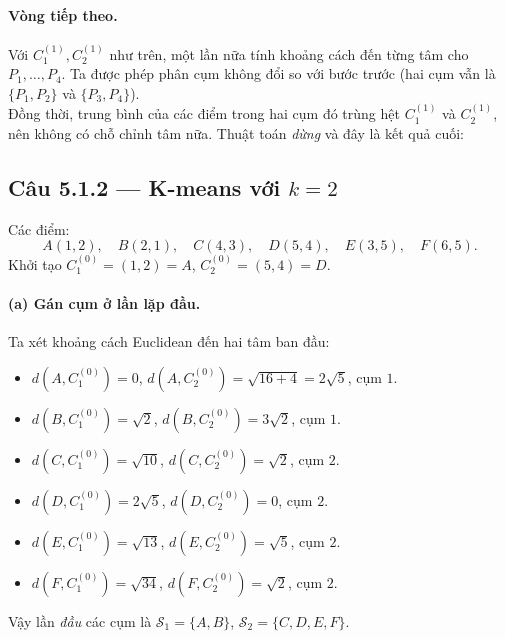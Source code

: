 \paragraph{Vòng tiếp theo.}
Với $C_1^{(1)}, C_2^{(1)}$ như trên, một lần nữa tính khoảng cách đến từng tâm cho $P_1,\ldots,P_4$. Ta được phép phân cụm không đổi so với bước trước (hai cụm vẫn là $\{P_1,P_2\}$ và $\{P_3,P_4\}$).\\
Đồng thời, trung bình của các điểm trong hai cụm đó trùng hệt $C_1^{(1)}$ và $C_2^{(1)}$, nên không có chỗ chỉnh tâm nữa. Thuật toán \emph{dừng} và đây là kết quả cuối:
\begin{center}
\end{center}

\subsection*{Câu 5.1.2 --- K-means với $k=2$}

Các điểm:
\[
A(1,2),\quad B(2,1),\quad C(4,3),\quad D(5,4),\quad E(3,5),\quad F(6,5).
\]
Khởi tạo $C_1^{(0)}=(1,2)=A$, $C_2^{(0)}=(5,4)=D$.

\paragraph{(a) Gán cụm ở lần lặp đầu.}
Ta xét khoảng cách Euclidean đến hai tâm ban đầu:
\begin{itemize}
  \item $d(A,C_1^{(0)})=0$, $d(A,C_2^{(0)})=\sqrt{16+4}=2\sqrt5$, cụm $1$.
  \item $d(B,C_1^{(0)})=\sqrt2$, $d(B,C_2^{(0)})=3\sqrt2$, cụm $1$.
  \item $d(C,C_1^{(0)})=\sqrt{10}$, $d(C,C_2^{(0)})=\sqrt2$, cụm $2$.
  \item $d(D,C_1^{(0)})=2\sqrt5$, $d(D,C_2^{(0)})=0$, cụm $2$.
  \item $d(E,C_1^{(0)})=\sqrt{13}$, $d(E,C_2^{(0)})=\sqrt5$, cụm $2$.
  \item $d(F,C_1^{(0)})=\sqrt{34}$, $d(F,C_2^{(0)})=\sqrt2$, cụm $2$.
\end{itemize}
Vậy lần \emph{đầu} các cụm là $\mathcal{S}_1=\{A,B\}$, $\mathcal{S}_2=\{C,D,E,F\}$.

